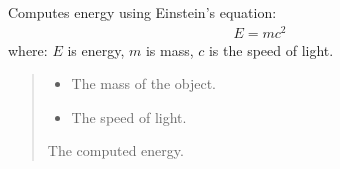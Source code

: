 \documentclass[a4paper,14pt,oneside,english,openany]{sphinxmanual}
\begin{document}
\begin{fulllineitems}
\label{\detokenize{pythagorus:pythagorus.energy}}
\pysigstartsignatures
{}
\pysigstopsignatures
\sphinxAtStartPar
Computes energy using Einstein’s equation:
\begin{equation*}
\begin{split}E=mc^2\end{split}
\end{equation*}
\sphinxAtStartPar
where:
\sphinxhyphen{} \(E\) is energy,
\sphinxhyphen{} \(m\) is mass,
\sphinxhyphen{} \(c\)    is the speed of light.
\begin{quote}\begin{description}
\begin{itemize}
\item {} 
\sphinxAtStartPar
{} \textendash{} The mass of the object.

\item {} 
\sphinxAtStartPar
{} \textendash{} The speed of light.

\end{itemize}

\sphinxAtStartPar
The computed energy.

\end{description}\end{quote}

\end{fulllineitems}

\end{document}
